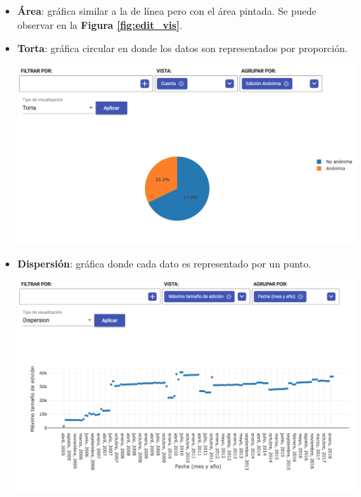 \begin{enumerate}
\begin{itemize}
    \item\textbf{Área}: gráfica similar a la de línea pero con el área pintada. Se puede observar en la \textbf{Figura \ref{fig:edit_vis}}.
    
    \item\textbf{Torta}: gráfica circular en donde los datos son representados por proporción.
        \begin{center}
          \bigbreak
          \includegraphics[scale=0.3]{images/marco_aplicativo/vis_pie.png}
          \label{fig:vis_pie}
          \bigbreak
        \end{center}
        
    \item\textbf{Dispersión}: gráfica donde cada dato es representado por un punto.
        \begin{center}
          \bigbreak
          \includegraphics[scale=0.35]{images/marco_aplicativo/vis_scatter.png}
          \label{fig:vis_scatter}
          \bigbreak
        \end{center}
  \end{itemize}
  

\end{enumerate}
